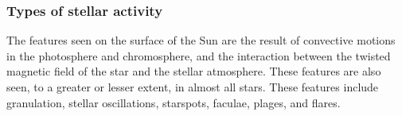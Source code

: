 \subsubsection{Types of stellar activity}
\label{secActivity}
The features seen on the surface of the Sun are the result of convective motions in the photosphere and chromosphere, and the interaction between the twisted magnetic field of the star and the stellar atmosphere. These features are also seen, to a greater or lesser extent, in almost all stars. These features include granulation, stellar oscillations, starspots, faculae, plages, and flares.\\

\begin{figure}
    \captionsetup{width=.45\textwidth}
    \caption{}
    \label{figGranSpots}
\end{figure}

